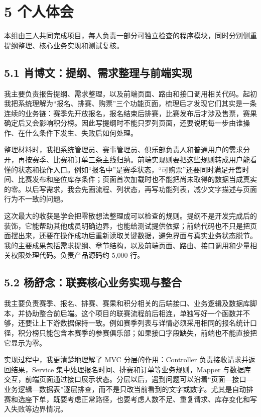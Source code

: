 \documentclass[UTF8,zihao=-4,a4paper]{ctexart}
\begin{document}
\section*{5 个人体会}

本组由三人共同完成项目，每人负责一部分可独立检查的程序模块，同时分别侧重提纲整理、核心业务实现和测试复核。


\subsection*{5.1 肖博文：提纲、需求整理与前端实现}

我主要负责报告提纲、需求整理，以及前端页面、路由和接口调用相关代码。起初我把系统理解为“报名、排赛、购票”三个功能页面，梳理后才发现它们其实是一条连续的业务链：赛季先开放报名，报名结束后排赛，比赛发布后才涉及售票，赛果确定后又会影响积分榜。因此写提纲时不能只罗列页面，还要说明每一步由谁操作、在什么条件下发生、失败后如何处理。


整理材料时，我把系统管理员、赛事管理员、俱乐部负责人和普通用户的需求分开，再按赛季、比赛和订单三条主线归纳。前端实现则要把这些规则转成用户能看懂的状态和操作入口。例如“报名中”是赛季状态，“可购票”还要同时满足开售时间、比赛发布和座位库存条件；页面首次加载时也不能把尚未取得的数据当成真实的零。以后写需求，我会先画流程、列状态，再写功能列表，减少文字描述与页面行为不一致的问题。


这次最大的收获是学会把零散想法整理成可以检查的规则。提纲不是开发完成后的装饰，它能帮助其他成员明确边界，也能给测试提供依据；前端代码也不只是把页面摆出来，还要在操作成功后重新读取关键数据，避免界面与真实业务状态脱节。我的主要成果包括需求提纲、章节结构，以及前端页面、路由、接口调用和少量相关权限处理代码。负责产品源码约 5,000 行。


\subsection*{5.2 杨舒念：联赛核心业务实现与整合}

我主要负责赛季、报名、排赛、赛果和积分相关的后端接口、业务逻辑及数据库脚本，并协助整合前后端。这个项目的联赛流程前后相连，单独写好一个函数并不够，还要让上下游数据保持一致。例如赛季列表与详情必须采用相同的报名统计口径，积分榜只能包含本赛季的参赛俱乐部；如果接口字段缺失，前端也不能直接把它显示为零。


实现过程中，我更清楚地理解了 MVC 分层的作用：Controller 负责接收请求并返回结果，Service 集中处理报名时间、排赛和订单等业务规则，Mapper 与数据库交互，前端页面通过接口展示状态。分层以后，遇到问题可以沿着“页面—接口—业务逻辑—数据表”逐层排查，而不是只改当前看到的文字或数字。尤其是自动排赛和选座下单，既要考虑正常路径，也要考虑人数不足、重复请求、库存变化和写入失败等边界情况。
\end{document}
